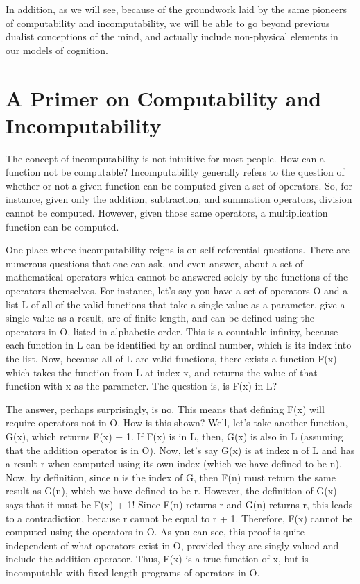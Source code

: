 In addition, as we will see, because of the groundwork laid by the same pioneers of computability and incomputability, we will be able to go beyond previous dualist conceptions of the mind, and actually include non-physical elements in our models of cognition.

\section[A Primer on Computability]{A Primer on Computability and Incomputability}

The concept of incomputability is not intuitive for most people.  How can a function not be computable?  Incomputability generally refers to the question of whether or not a given function can be computed given a set of operators.  So, for instance, given only the addition, subtraction, and summation operators, division cannot be computed.  However, given those same operators, a multiplication function can be computed.  

One place where incomputability reigns is on self-referential questions.  There are numerous questions that one can ask, and even answer, about a set of mathematical operators which cannot be answered solely by the functions of the operators themselves.  For instance, let's say you have a set of operators O and a list L of all of the valid functions that take a single value as a parameter, give a single value as a result, are of finite length, and can be defined using the operators in O, listed in alphabetic order.  This is a countable infinity, because each function in L can be identified by an ordinal number, which is its index into the list.  Now, because all of L are valid functions, there exists a function F(x) which takes the function from L at index x, and returns the value of that function with x as the parameter.  The question is, is F(x) in L?  

The answer, perhaps surprisingly, is no.  This means that defining F(x) will require operators not in O.  How is this shown?  Well, let's take another function, G(x), which returns F(x) + 1.  If F(x) is in L, then, G(x) is also in L (assuming that the addition operator is in O).  Now, let's say G(x) is at index n of L and has a result r when computed using its own index (which we have defined to be n).   Now, by definition, since n is the index of G, then F(n) must return the same result as G(n), which we have defined to be r.  However, the definition of G(x) says that it must be F(x) + 1!  Since F(n) returns r and G(n) returns r, this leads to a contradiction, because r cannot be equal to r + 1.  Therefore, F(x) cannot be computed using the operators in O. As you can see, this proof is quite independent of what operators exist in O, provided they are singly-valued and include the addition operator.  Thus, F(x) is a true function of x, but is incomputable with fixed-length programs of operators in O.

